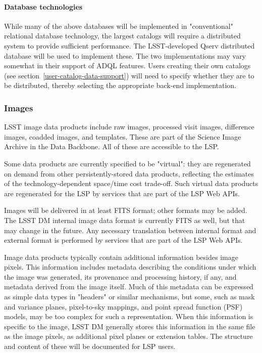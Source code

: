 \paragraph{Database technologies}\label{database-technologies}

While many of the above databases will be implemented in "conventional"
relational database technology, the largest catalogs will require a distributed
system to provide sufficient performance.  The LSST-developed Qserv distributed
database will be used to implement these.  The two implementations may vary
somewhat in their support of ADQL features.  Users creating their own catalogs
(see section~\ref{user-catalog-data-support}) will need to specify whether they are to be
distributed, thereby selecting the appropriate back-end implementation.

\subsubsection{Images}\label{images}

LSST image data products include raw images, processed visit images, difference
images, coadded images, and templates.  These are part of the Science Image
Archive in the Data Backbone.  All of these are accessible to the LSP.

Some data products are currently specified to be "virtual": they are
regenerated on demand from other persistently-stored data products, reflecting
the estimates of the technology-dependent space/time cost trade-off.  Such
virtual data products are regenerated for the LSP by services that are part of
the LSP Web APIs.

Images will be delivered in at least FITS format; other formats may be added.
The LSST DM internal image data format is currently FITS as well, but that may
change in the future.  Any necessary translation between internal format and
external format is performed by services that are part of the LSP Web APIs.

Image data products typically contain additional information besides image
pixels.  This information includes metadata describing the conditions under
which the image was generated, its provenance and processing history, if any,
and metadata derived from the image itself.  Much of this metadata can be
expressed as simple data types in "headers" or similar mechanisms, but some,
such as mask and variance planes, pixel-to-sky mappings, and point spread
function (PSF) models, may be too complex for such a representation.  When this
information is specific to the image, LSST DM generally stores this information
in the same file as the image pixels, as additional pixel planes or extension
tables.  The structure and content of these will be documented for LSP users.

